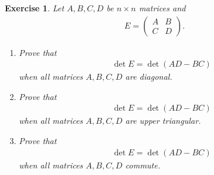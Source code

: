\documentclass[10pt]{book}
\newtheorem{exercise}{Exercise}[section]
\theoremstyle{definition}
\numberwithin{equation}{chapter}
\begin{document}
\begin{exercise}
Let $A, B, C, D$ be $n \times n$ matrices and 
\begin{align*}
    E = \begin{pmatrix}
        A & B \\
        C & D
    \end{pmatrix}.
\end{align*}
\begin{enumerate}[label=(\alph*)]
    \item Prove that 
    \begin{align*}
        \det E = \det (AD - BC)
    \end{align*}
    when all matrices $A, B, C, D$ are diagonal.
    
    \item Prove that 
    \begin{align*}
        \det E = \det (AD - BC)
    \end{align*}
    when all matrices $A, B, C, D$ are upper triangular. 
    
    \item Prove that
    \begin{align*}
        \det E = \det (AD - BC)
    \end{align*}
    when all matrices $A, B, C, D$ commute. 
\end{enumerate}
\end{exercise}
\end{document}
